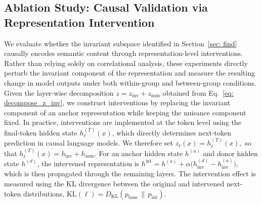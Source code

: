 \subsection{Ablation Study: Causal Validation via Representation Intervention}
\label{sec:ab_mainpaper}

We evaluate whether the invariant subspace identified in Section~\ref{sec: find} causally encodes semantic content through representation-level interventions. Rather than relying solely on correlational analysis, these experiments directly perturb the invariant component of the representation and measure the resulting change in model outputs under both within-group and between-group conditions. 
Given the layer-wise decomposition
\(
z = z_{\mathrm{inv}} + z_{\mathrm{nuis}}
\)
obtained from Eq.~\ref{eq: decompose_z_inv}, we construct interventions by replacing the invariant component of an anchor representation while keeping the nuisance component fixed. In practice, interventions are implemented at the token level using the final-token hidden state $h_\ell^{(T)}(x)$, which directly determines next-token prediction in causal language models. We therefore set
\(
z_\ell(x) = h_\ell^{(T)}(x),
\)
so that
\(
h_\ell^{(T)}(x)=h_{\mathrm{inv}}+h_{\mathrm{nuis}}.
\) 
For an anchor hidden state $h^{(a)}$ and donor hidden state $h^{(d)}$, the intervened representation is
\(
h^{\mathrm{int}}
=
h^{(a)}
+
\alpha
\big(
h_{\mathrm{inv}}^{(d)}
-
h_{\mathrm{inv}}^{(a)}
\big),
\)
which is then propagated through the remaining layers. The intervention effect is measured using the KL divergence between the original and intervened next-token distributions,
\(
\mathrm{KL}(\ell)
=
D_{\mathrm{KL}}
\!\left(
p_{\mathrm{base}}
\,\|\,
p_{\mathrm{int}}
\right).
\) 


